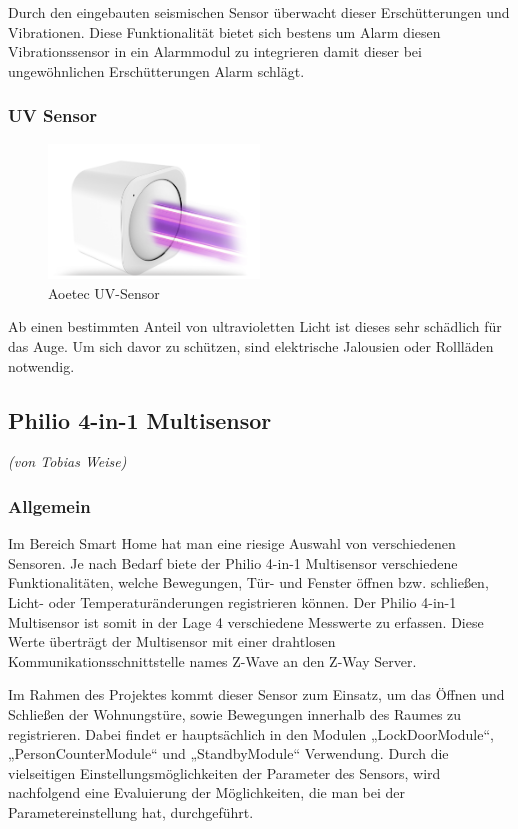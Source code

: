 Durch den eingebauten seismischen Sensor überwacht dieser Erschütterungen und Vibrationen. Diese Funktionalität bietet sich bestens um Alarm diesen Vibrationssensor in ein Alarmmodul zu integrieren damit dieser bei ungewöhnlichen Erschütterungen Alarm schlägt.

\subsubsection{UV Sensor}
\begin{figure}[h!]
	\centering
	\includegraphics[width=0.5\textwidth]{img/Sensorevaluation/AeoUV.png}
	\caption{Aoetec UV-Sensor}
	\label{fig:sensorenAeoUV}
\end{figure}

Ab einen bestimmten Anteil von ultravioletten Licht ist dieses sehr schädlich für das Auge. Um sich davor zu schützen, sind elektrische Jalousien oder Rollläden notwendig.



\subsection{Philio 4-in-1 Multisensor}
\emph{(von Tobias Weise)}
\subsubsection{Allgemein}
Im Bereich Smart Home hat man eine riesige Auswahl von verschiedenen Sensoren. Je nach Bedarf biete der Philio 4-in-1 Multisensor verschiedene Funktionalitäten, welche Bewegungen, Tür- und Fenster öffnen bzw. schließen, Licht- oder Temperaturänderungen registrieren können. Der Philio 4-in-1 Multisensor ist somit in der Lage 4 verschiedene Messwerte zu erfassen. Diese Werte überträgt der Multisensor mit einer drahtlosen Kommunikationsschnittstelle names Z-Wave an den Z-Way Server.

Im Rahmen des Projektes kommt dieser Sensor zum Einsatz, um das Öffnen und Schließen der Wohnungstüre, sowie Bewegungen innerhalb des Raumes zu registrieren. Dabei findet er hauptsächlich in den Modulen „LockDoorModule“, „PersonCounterModule“ und „StandbyModule“ Verwendung. Durch die vielseitigen Einstellungsmöglichkeiten der Parameter des Sensors, wird nachfolgend eine Evaluierung der Möglichkeiten, die man bei der Parametereinstellung hat, durchgeführt.

